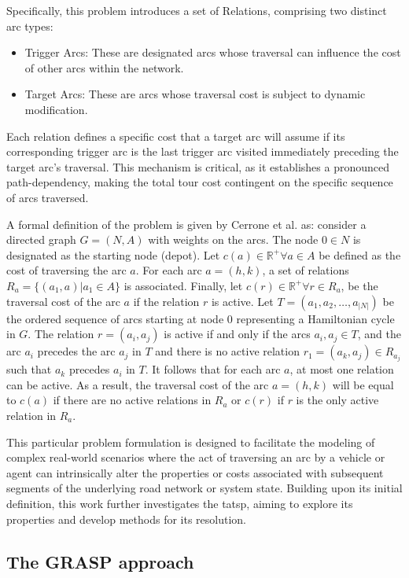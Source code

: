 \documentclass[twocolumn, switch]{article} %
\begin{document}
Specifically, this problem introduces a set of Relations, comprising two distinct arc types:
\begin{itemize}
\item Trigger Arcs: These are designated arcs whose traversal can influence the cost of other arcs within the network.
\item Target Arcs: These are arcs whose traversal cost is subject to dynamic modification.
\end{itemize}
Each relation defines a specific cost that a target arc will assume if its corresponding trigger arc is the last trigger 
arc visited immediately preceding the target arc's traversal. This mechanism is critical, as it establishes a pronounced 
path-dependency, making the total tour cost contingent on the specific sequence of arcs traversed.

A formal definition of the problem is given by Cerrone et al. \cite{Cerrone} as:
consider a directed graph $G = (N,A)$ with weights on the arcs. 
The node $0 \in N$ is designated as the starting node (depot). Let $c(a) \in \mathbb{R}^+ \forall a \in A$ 
be defined as the cost of traversing the arc $a$. For each arc $a=(h, k)$, a set of relations $R_a = \{(a_1, a)| a_1 \in A\}$ 
is associated. Finally, let $c(r) \in \mathbb{R}^+ \forall r \in R_a$, be the traversal cost of the arc $a$ if the relation $r$ 
is active. Let $T = (a_1, a_2, \ldots, a_{|N|})$ be the ordered sequence of arcs starting at node $0$ representing a Hamiltonian 
cycle in $G$. The relation $r = (a_i, a_j)$ is active if and only if the arcs $a_i, a_j \in T$, and the arc $a_i$ precedes the arc 
$a_j$ in $T$ and there is no active relation $r_1 = (a_k, a_j) \in R_{a_j}$ such that $a_k$ precedes $a_i$ in $T$. It follows that 
for each arc $a$, at most one relation can be active. As a result, the traversal cost of the arc $a = (h, k)$ will be equal to $c(a)$ 
if there are no active relations in $R_a$ or $c(r)$ if $r$ is the only active relation in $R_a$.

This particular problem formulation is designed to facilitate the modeling of complex real-world scenarios where the act of 
traversing an arc by a vehicle or agent can intrinsically alter the properties or costs associated with subsequent segments of 
the underlying road network or system state. Building upon its initial definition, this work further investigates the \gls{tatsp}, 
aiming to explore its properties and develop methods for its resolution.

\subsection{The GRASP approach}
\lipsum[4]
\end{document}
